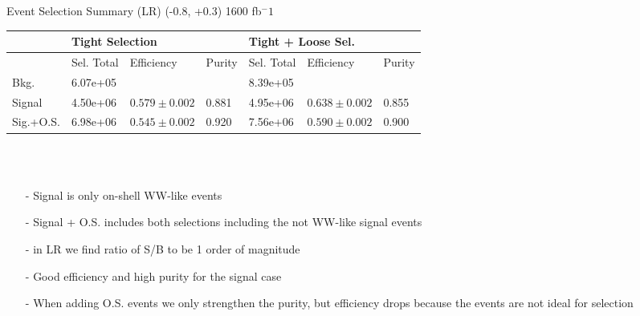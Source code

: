 \documentclass[10pt]{beamer}
\begin{document}
\begin{frame}{Event Selection Summary (LR)}
 \tiny
 (-0.8, +0.3) 1600 fb${^-1}$\\
 \begin{tabular}{ |p{}|p{}p{}|p{}|p{}p{}p{}|} 
 \hline 
   &  \multicolumn{3}{|l|}{Tight Selection} &  \multicolumn{3}{|l|}{ Tight + Loose Sel.}  \\  \hline  
 & Sel. Total & Efficiency & Purity & Sel. Total & Efficiency & Purity \\ 
 \hline  
 Bkg. & 6.07e+05 & & & 8.39e+05 & &  \\ 
 Signal & 4.50e+06 & $0.579 \pm 0.002$ & 0.881 & 4.95e+06 & $0.638 \pm 0.002$ & 0.855 \\ 
 Sig.+O.S. & 6.98e+06 & $0.545 \pm 0.002$ & 0.920 & 7.56e+06 & $0.590 \pm 0.002$ & 0.900 \\ 
\hline 
\end{tabular} \\
\normalsize
\quad \quad \\
\scriptsize
\begin{itemize}
\item[-] Signal is only on-shell WW-like events
\item[-] Signal + O.S. includes both selections including the not WW-like signal events
\item[-] in LR we find ratio of S/B to be 1 order of magnitude
\item[-] Good efficiency and high purity for the signal case
\item[-] When adding O.S. events we only strengthen the purity, but efficiency drops because the events are not ideal for selection
\end{itemize}

\end{frame}
\end{document}
